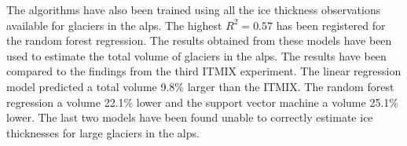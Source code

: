 The algorithms have also been trained using all the ice thickness observations available for glaciers in the alps. The highest $R^2=0.57$ has been registered for the random forest regression. The results obtained from these models have been used to estimate the total volume of glaciers in the alps. The results have been compared to the findings from the third ITMIX experiment. The linear regression model predicted a total volume 9.8\% larger than the ITMIX. The random forest regression a volume 22.1\% lower and the support vector machine a volume 25.1\% lower. The last two models have been found unable to correctly estimate ice thicknesses for large glaciers in the alps.   
%
%
